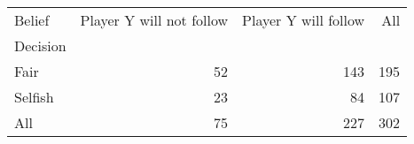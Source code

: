 \begin{tabular}{lrrr}
\toprule
Belief &  Player Y will not follow &  Player Y will follow &  All \\
Decision &                           &                       &      \\
\midrule
Fair     &                        52 &                   143 &  195 \\
Selfish  &                        23 &                    84 &  107 \\
All      &                        75 &                   227 &  302 \\
\bottomrule
\end{tabular}
